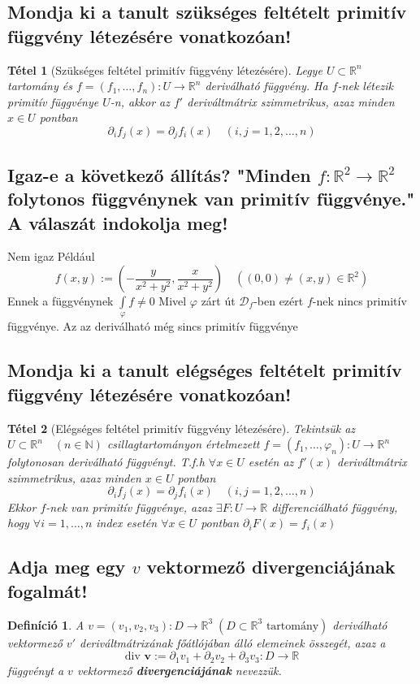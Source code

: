 \documentclass[12pt,a4paper]{article}
\newcommand{\R}{\mathbb{R}}
\newcommand{\N}{\mathbb{N}}
\newcommand{\f}{\varphi}
\newcommand{\bb}[1]{\left( #1 \right)}
\newtheorem{tet}{Tétel}[section]
\newtheorem{defi}{Definíció}[section]
\begin{document}
\subsection{Mondja ki a tanult szükséges feltételt primitív függvény létezésére vonatkozóan!}
\begin{tet}[Szükséges feltétel primitív függvény létezésére]
Legye $U \subset \R^n$ tartomány és $f = \bb{f_1,\ldots,f_n} : U \to \R^n$ deriválható függvény. Ha $f$-nek létezik primitív függvénye $U$-n, akkor az $f'$ deriváltmátrix szimmetrikus, azaz minden $x \in U$ pontban
\[
\partial_if_j(x)=\partial_jf_i(x) \quad \bb{i,j = 1,2,\ldots,n}
\]
\end{tet}
\subsection{Igaz-e a következő állítás? "Minden $f : \R^2 \to \R^2$ folytonos függvénynek van primitív függvénye." A válaszát indokolja meg!}
Nem igaz
Például
\[
f(x,y) := \bb{-\frac{y}{x^2+y^2},\frac{x}{x^2+y^2}} \quad \bb{(0,0) \neq (x,y) \in \R^2}
\]
Ennek a függvénynek $\int\limits_\f f \neq 0$ Mivel $\f$ zárt út $\mathcal{D}_f$-ben ezért $f$-nek nincs primitív függvénye. Az az deriválható még sincs primitív függvénye
\subsection{Mondja ki a tanult elégséges feltételt primitív függvény létezésére vonatkozóan!}
\begin{tet}[Elégséges feltétel primitív függvény létezésére]
Tekintsük az $U \subset \R^n \quad (n\in \N)$ csillagtartományon értelmezett $f=\bb{f_1,\ldots,\f_n} : U \to \R^n$ folytonosan deriválható függvényt.
T.f.h $\forall x \in U$ esetén az $f'(x)$ deriváltmátrix szimmetrikus, azaz minden $x \in U$ pontban
\[
\partial_if_j(x)=\partial_jf_i(x) \quad \bb{i,j = 1,2,\ldots,n}
\]
Ekkor $f$-nek van primitív függvénye, azaz $\exists F: U \to \R$ differenciálható függvény, hogy $\forall i = 1,\ldots,n$ index esetén $\forall x \in U$ pontban $\partial_iF(x)=f_i(x)$ 
\end{tet}
\subsection{Adja meg egy $v$ vektormező divergenciájának fogalmát!}
\begin{defi}
A $v = \bb{v_1,v_2,v_3} : D \to \R^3 \; \bb{D \subset \R^3 \text{ tartomány} }$ deriválható vektormező $v'$ deriváltmátrixának főátlójában álló elemeinek összegét, azaz a
\[
\text{div } \textbf{v} := \partial_1v_1+\partial_2v_2 + \partial_3v_3 : D \to \R
\]
függvényt a $v$ vektormező \textbf{divergenciájának} nevezzük.
\end{defi}
\end{document}
